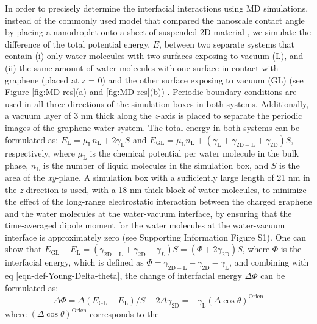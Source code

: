\documentclass[journal=jacsat,manuscript=article,email=true]{achemso}
\begin{document}
In order to precisely determine the interfacial interactions using MD
simulations, instead of the commonly used model that compared the
nanoscale contact angle by placing a nanodroplet onto a sheet of
suspended 2D material
\cite{ostrowski_tunable_2014,daub_electrowetting_2007,ren_interfacial_2015,Taherian_2015},
we simulate the difference of the total potential energy, \(E\), between
two separate systems that contain (i) only water molecules with two
surfaces exposing to vacuum (L), and (ii) the same amount of water
molecules with one surface in contact with graphene (placed at z = 0)
and the other surface exposing to vacuum (GL) (see Figure
\ref{fig:MD-res}(a) and \ref{fig:MD-res}(b)) . Periodic boundary
conditions are used in all three directions of the simulation boxes in
both systems. Additionally, a vacuum layer of 3 nm thick along the
\emph{z}-axis is placed to separate the periodic images of the
graphene-water system. The total energy in both systems can be
formulated as: \(E_{\mathrm{L}} = \mu_{\mathrm{L}}n_{\mathrm{L}} +
2\gamma_{\mathrm{L}}S\) and
\(E_{\mathrm{GL}}=\mu_{\mathrm{L}}n_{\mathrm{L}}+(\gamma_{\mathrm{L}} +
\gamma_{\mathrm{2D-L}} + \gamma_{\mathrm{2D}})S\), respectively, where
\(\mu_{\mathrm{L}}\) is the chemical potential per water molecule in the
bulk phase, \(n_{\mathrm{L}}\) is the number of liquid molecules in the
simulation box, and \(S\) is the area of the \emph{xy}-plane.  A simulation
box with a sufficiently large length of 21 nm in the \emph{z}-direction is used,
with a 18-nm thick block of water molecules, to minimize the effect of
the long-range electrostatic interaction between the charged graphene
and the water molecules at the water-vacuum interface, by ensuring
that the time-averaged dipole moment for the water molecules at the
water-vacuum interface is approximately zero (see Supporting Information
Figure S1).  One can show that \(E_{\mathrm{GL}} - E_{\mathrm{L}} =
(\gamma_{\mathrm{2D-L}} + \gamma_{\mathrm{2D}} - \gamma_{L})S =
(\Phi + 2 \gamma_{\mathrm{2D}})S\), where \(\Phi\) is the interfacial
energy, which is defined as \(\Phi = \gamma_{\mathrm{2D-L}} -
\gamma_{\mathrm{2D}} - \gamma_{\mathrm{L}}\), and combining with eq
\ref{eqn-def-Young-Delta-theta}, the change of interfacial energy
\(\Delta \Phi\) can be formulated as:
\begin{equation}
\label{eqn-Delta-Phi-Delta-cos}
\Delta \Phi = \Delta (E_{\mathrm{GL}} - E_{\mathrm{L}})/S - 2\Delta \gamma_{\mathrm{2D}} = -\gamma_{\mathrm{L}} (\Delta \cos \theta)^{\mathrm{Orien}}
\end{equation}
where \((\Delta\cos \theta)^{\mathrm{Orien}}\) corresponds to the
\end{document}
